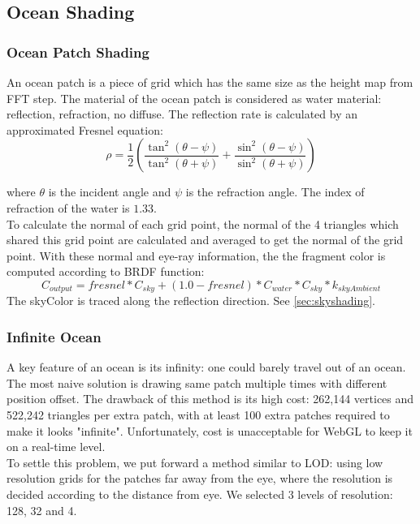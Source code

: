 \documentclass{jcgt}
\begin{document}
\subsection{Ocean Shading}
\subsubsection{Ocean Patch Shading}

An ocean patch is a piece of grid which has the same size as the height map from FFT step. The material of the ocean patch is considered as water material: reflection, refraction, no diffuse. The reflection rate is calculated by an approximated Fresnel equation:
\begin{equation}
\rho = \frac{1}{2} (\frac{\tan ^2 (\theta-\psi)}{\tan ^2 (\theta+\psi)} + \frac{\sin ^2 (\theta-\psi)}{\sin ^2 (\theta+\psi)} )
\end{equation}

where $\theta$ is the incident angle and $\psi$ is the refraction angle. The index of refraction of the water is $1.33$. \\

To calculate the normal of each grid point, the normal of the 4 triangles which shared this grid point are calculated and averaged to get the normal of the grid point.
With these normal and eye-ray information, the the fragment color is computed according to BRDF function:
\begin{equation}
 C_{output}=fresnel * C_{sky} + (1.0-fresnel) * C_{water} * C_{sky} * k_{skyAmbient}
\end{equation}
The skyColor is traced along the reflection direction. See \ref{sec:skyshading}.

\subsubsection{Infinite Ocean}

A key feature of an ocean is its infinity: one could barely travel out of an ocean. The most naive solution is drawing same patch multiple times with different position offset. The drawback of this method is its high cost: 262,144 vertices and 522,242 triangles per extra patch, with at least 100 extra patches required to make it looks "infinite". Unfortunately, cost is unacceptable for WebGL to keep it on a real-time level. \\

To settle this problem, we put forward a method similar to LOD: using low resolution grids for the patches far away from the eye, where the resolution is decided according to the distance from eye. We selected 3 levels of resolution: 128, 32 and 4. \\
\end{document}
